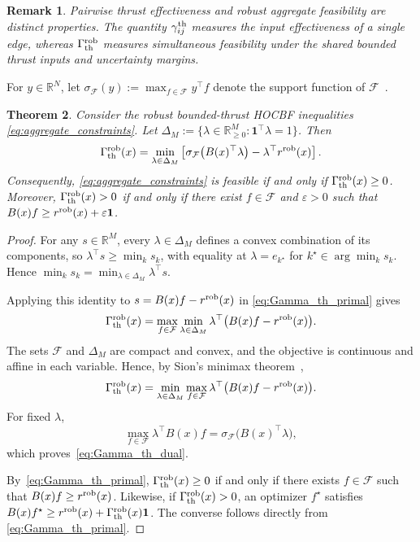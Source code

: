 \documentclass[journal,twoside,web]{ieeecolor}
\newtheorem{theorem}{Theorem}[section]
\newtheorem{remark}[theorem]{Remark}
\begin{document}
\begin{remark}
Pairwise thrust effectiveness and robust aggregate feasibility
are distinct properties. The quantity $\gamma_{ij}^{\rm th}$
measures the input effectiveness of a single edge, whereas
$\Gamma_{\rm th}^{\rm rob}$ measures simultaneous feasibility
under the shared bounded thrust inputs and uncertainty margins.
\end{remark}

For $y\in\mathbb R^N$, let
$\sigma_{\mathcal F}(y):=\max_{f\in\mathcal F}y^\top f$
denote the support function of $\mathcal F$~\cite{boyd2004convex}.

\begin{theorem}\label{thm:robust_aggregate_feasibility}
Consider the robust bounded-thrust HOCBF inequalities
\eqref{eq:aggregate_constraints}. Let
$\Delta_M:=\{\lambda\in\mathbb R_{\ge0}^M:
\mathbf 1^\top\lambda=1\}$. Then
\begin{equation}
    \Gamma_{\rm th}^{\rm rob}(x)
    =
    \min_{\lambda\in\Delta_M}
    \left[
        \sigma_{\mathcal F}\big(B(x)^\top\lambda\big)
        -
        \lambda^\top r^{\rm rob}(x)
    \right].
    \label{eq:Gamma_th_dual}
\end{equation}
Consequently, \eqref{eq:aggregate_constraints} is feasible
if and only if $\Gamma_{\rm th}^{\rm rob}(x)\ge0$.
Moreover, $\Gamma_{\rm th}^{\rm rob}(x)>0$ if and only if
there exist $f\in\mathcal F$ and $\varepsilon>0$ such that
$B(x)f\ge r^{\rm rob}(x)+\varepsilon\mathbf 1$.
\end{theorem}

\begin{proof}
For any $s\in\mathbb R^M$, every $\lambda\in\Delta_M$
defines a convex combination of its components, so
$\lambda^\top s\ge\min_k s_k$, with equality at
$\lambda=e_{k^\star}$ for
$k^\star\in\arg\min_k s_k$. Hence
$\min_k s_k
    =
    \min_{\lambda\in\Delta_M}\lambda^\top s$.

Applying this identity to
$s=B(x)f-r^{\rm rob}(x)$ in
\eqref{eq:Gamma_th_primal} gives
\[
    \Gamma_{\rm th}^{\rm rob}(x)
    =
    \max_{f\in\mathcal F}
    \min_{\lambda\in\Delta_M}
    \lambda^\top\big(B(x)f-r^{\rm rob}(x)\big).
\]
The sets $\mathcal F$ and $\Delta_M$ are compact and convex,
and the objective is continuous and affine in each variable.
Hence, by Sion's minimax theorem~\cite{sion1958general},
\[
    \Gamma_{\rm th}^{\rm rob}(x)
    =
    \min_{\lambda\in\Delta_M}
    \max_{f\in\mathcal F}
    \lambda^\top\big(B(x)f-r^{\rm rob}(x)\big).
\]
For fixed $\lambda$,
\[
    \max_{f\in\mathcal F}\lambda^\top B(x)f
    =
    \sigma_{\mathcal F}\big(B(x)^\top\lambda\big),
\]
which proves~\eqref{eq:Gamma_th_dual}.

By~\eqref{eq:Gamma_th_primal},
$\Gamma_{\rm th}^{\rm rob}(x)\ge0$ if and only if there exists
$f\in\mathcal F$ such that
$B(x)f\ge r^{\rm rob}(x)$.
Likewise, if $\Gamma_{\rm th}^{\rm rob}(x)>0$, an optimizer
$f^\star$ satisfies
$B(x)f^\star\ge r^{\rm rob}(x)
+\Gamma_{\rm th}^{\rm rob}(x)\mathbf 1$.
The converse follows directly from
\eqref{eq:Gamma_th_primal}.
\end{proof}
\end{document}
